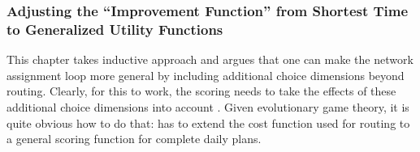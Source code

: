 



\subsubsection{Adjusting the ``Improvement Function'' from Shortest
Time to Generalized Utility Functions}
\label{sec:adjust-impr-funct}

\def\perf{{\it perf}}


This chapter takes  inductive approach and argues that one can
make the network assignment loop more general by including additional
choice dimensions beyond routing.  Clearly, for this to work, the
 scoring needs to take the effects of these
additional choice dimensions into account \citep[also
  see][]{Balmer_PhDThesis_2007}.  Given evolutionary game theory, it is quite
obvious how to do that:  has to extend the cost
function used for routing to a general scoring function for
complete daily plans.


